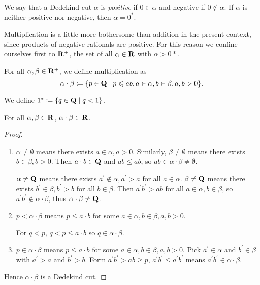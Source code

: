 We say that a Dedekind cut $\alpha$ is \emph{positive} if $0\in\alpha$ and negative if $0\notin\alpha$. If $\alpha$ is neither positive nor negative, then $\alpha=0^*$.

Multiplication is a little more bothersome than addition in the present context, since products of negative rationals are positive. For this reason we confine ourselves first to $\mathbf R^+$, the set of all $\alpha\in\mathbf R$ with $\alpha>0*$.

For all $\alpha,\beta\in\mathbf R^+$, we define multiplication as
\[\alpha\cdot\beta\coloneqq\{p\in\mathbf Q\mid p\leqslant ab,a\in\alpha,b\in\beta,a,b>0\}.\]

We define $1^*\coloneqq\{q\in\mathbf Q\mid q<1\}$.



\begin{proposition*}
For all $\alpha,\beta\in\mathbf R$, $\alpha\cdot\beta\in\mathbf R$.
\end{proposition*}

\begin{proof} \
\begin{enumerate}[label=(\roman*)]
\item $\alpha\neq\emptyset$ means there exists $a\in\alpha,a>0$. Similarly, $\beta\neq\emptyset$ means there exists $b\in\beta,b>0$. Then $a\cdot b\in\mathbf Q$ and $ab\le ab$, so $ab\in\alpha\cdot\beta\neq\emptyset$.

$\alpha\neq\mathbf Q$ means there exists $a^\prime\notin\alpha,a^\prime>a$ for all $a\in\alpha$. $\beta\neq\mathbf Q$ means there exists $b^\prime\in\beta,b^\prime>b$ for all $b\in\beta$. Then $a^\prime b^\prime>ab$ for all $a\in\alpha,b\in\beta$, so $a^\prime b^\prime\notin\alpha\cdot\beta$, thus $\alpha\cdot\beta\neq\mathbf Q$.

\item $p<\alpha\cdot\beta$ means $p\le a\cdot b$ for some $a\in\alpha,b\in\beta,a,b>0$.

For $q<p$, $q<p\le a\cdot b$ so $q\in\alpha\cdot\beta$.

\item $p\in\alpha\cdot\beta$ means $p\le a\cdot b$ for some $a\in\alpha,b\in\beta,a,b>0$. Pick $a^\prime\in\alpha$ and $b^\prime\in\beta$ with $a^\prime>a$ and $b^\prime>b$. Form $a^\prime b^\prime>ab\ge p$, $a^\prime b^\prime\le a^\prime b^\prime$ means $a^\prime b^\prime\in\alpha\cdot\beta$.
\end{enumerate}
Hence $\alpha\cdot\beta$ is a Dedekind cut.
\end{proof}


